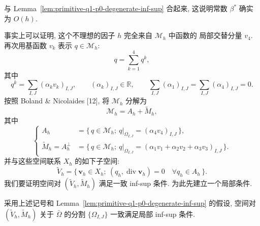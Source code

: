 与 Lemma~\ref{lem:primitive-q1-p0-degenerate-inf-sup} 合起来, 这说明常数
$\beta^*$ 确实为 $O(h)$.

事实上可以证明, 这个不理想的因子 $h$ 完全来自 $\mathcal M_h$ 中函数的
局部交替分量 $v_4$. 再次用基函数 $v_k$ 表示 $q\in\mathcal M_h$:
\[
q=\sum_{k=1}^{4}q^k,
\]
其中
\[
q^k=\sum_{I,J}(\alpha_kv_k)_{I,J},
\qquad(\alpha_k)_{I,J}\in\mathbb R,
\qquad\sum_{I,J}(\alpha_1)_{I,J}
=\sum_{I,J}(\alpha_4)_{I,J}=0.
\]
按照 Boland \& Nicolaides [12], 将 $\mathcal M_h$ 分解为
\[
\mathcal M_h=A_h+\widetilde M_h,
\]
其中
\begin{equation}\label{eq:primitive-q1-p0-pressure-decomposition}
\left\{
\begin{aligned}
A_h&=\{\,q\in\mathcal M_h;
\ q|_{\Omega_{I,J}}=(\alpha_4v_4)_{I,J}\,\},\\
\widetilde M_h=A_h^\perp
&=\{\,q\in\mathcal M_h;
\ q|_{\Omega_{I,J}}=(\alpha_1v_1+\alpha_2v_2+\alpha_3v_3)_{I,J}\,\}.
\end{aligned}
\right.
\end{equation}
并与这些空间联系 $X_h$ 的如下子空间:
\begin{equation}\label{eq:primitive-q1-p0-filtered-velocity-space}
\widetilde V_h=\{\,\mathbf v_h\in X_h;
\ (q_h,\operatorname{div}\mathbf v_h)=0
\quad\forall q_h\in A_h\,\}.
\end{equation}
我们要证明空间对 $(\widetilde V_h,\widetilde M_h)$ 满足一致 inf-sup 条件.
为此先建立一个局部条件.

\setcounter{statement}{6}
\renewcommand{\theHstatement}{lemma.\thesection.\arabic{statement}}
\begin{Lemma}\label{lem:primitive-q1-p0-macroelement-local-inf-sup}
采用上述记号和 Lemma~\ref{lem:primitive-q1-p0-degenerate-inf-sup} 的假设,
空间对 $(\widetilde V_h,\widetilde M_h)$ 关于 $\bar\Omega$ 的分割
$\{\Omega_{I,J}\}$ 一致满足局部 inf-sup 条件.
\end{Lemma}

